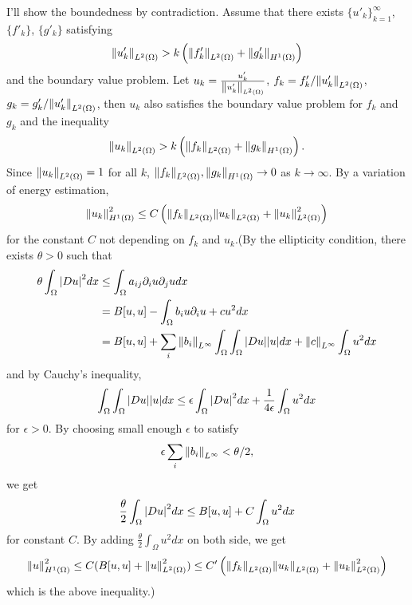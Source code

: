 \documentclass{article}
\begin{document}
I'll show the boundedness by contradiction. Assume that there exists $\{u'_k\}_{k=1}^\infty$, $\{f'_k\}$, $\{g'_k\}$ satisfying
\begin{equation*}
\norm{u'_k}_{L^2(\Omega)}>k\left(\norm{f'_k}_{L^2(\Omega)}+\norm{g'_k}_{H^1(\Omega)}\right)
\end{equation*}
and the boundary value problem. Let $u_k=\frac{u'_k}{\norm{u'_k}_{L^2(\Omega)}}$, $f_k=f'_k/{\norm{u'_k}_{L^2(\Omega)}}$, $g_k=g'_k/{\norm{u'_k}_{L^2(\Omega)}}$, then $u_k$ also satisfies the boundary value problem for $f_k$ and $g_k$ and the inequality
\begin{equation*}
\norm{u_k}_{L^2(\Omega)}>k\left(\norm{f_k}_{L^2(\Omega)}+\norm{g_k}_{H^1(\Omega)}\right).
\end{equation*}
Since $\norm{u_k}_{L^2(\Omega)}=1$ for all $k$, $\norm{f_k}_{L^2(\Omega)}, \norm{g_k}_{H^1(\Omega)}\rightarrow 0$ as $k\rightarrow \infty$. By a variation of energy estimation,
\begin{equation*}
\norm{u_k}^2_{H^1(\Omega)}\leq C\left(\norm{f_k}_{L^2(\Omega)}\norm{u_k}_{L^2(\Omega)}+\norm{u_k}^2_{L^2(\Omega)}\right)
\end{equation*}
for the constant $C$ not depending on $f_k$ and $u_k$.(By the ellipticity condition, there exists $\theta>0$ such that
\begin{equation*}
\begin{split}
\theta\int_\Omega \abs{Du}^2dx & \leq \int_\Omega a_{ij}\partial_i u\partial_j u dx \\
&=B[u,u]-\int_\Omega b_iu\partial_i u+cu^2 dx \\
&=B[u,u]+\sum\limits_{i}\norm{b_i}_{L^\infty}\int_\Omega \int_\Omega \abs{Du}\abs{u}dx+\norm{c}_{L^\infty}\int_\Omega u^2 dx
\end{split}
\end{equation*}
and by Cauchy's inequality,
\begin{equation*}
\int_\Omega \int_\Omega \abs{Du}\abs{u}dx\leq \epsilon\int_\Omega \abs{Du}^2 dx+\frac{1}{4\epsilon}\int_\Omega u^2 dx
\end{equation*}
for $\epsilon>0$. By choosing small enough $\epsilon$ to satisfy 
\begin{equation*}
\epsilon\sum\limits_{i} \norm{b_i}_{L^\infty}<\theta/2,
\end{equation*}
we get
\begin{equation*}
\frac{\theta}{2}\int_\Omega \abs{Du}^2 dx\leq B[u,u]+C\int_\Omega u^2 dx
\end{equation*}
for constant $C$. By adding $\frac{\theta}{2}\int_\Omega u^2 dx$ on both side, we get
\begin{equation*}
\norm{u}^2_{H^1(\Omega)}\leq C(B[u,u]+\norm{u}^2_{L^2(\Omega)})\leq C'\left(\norm{f_k}_{L^2(\Omega)}\norm{u_k}_{L^2(\Omega)}+\norm{u_k}^2_{L^2(\Omega)}\right)
\end{equation*}
which is the above inequality.)
\end{document}

